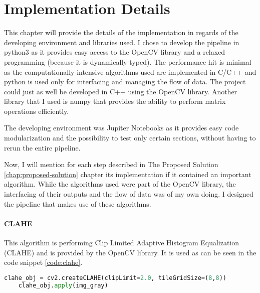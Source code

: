 \chapter{Implementation Details}\pagestyle{fancy}\setlength{\parindent}{3em}
\label{chap:implementation-details}

This chapter will provide the details of the implementation in regards of the developing environment and libraries used. I chose to develop the pipeline in python3 \cite{site:python-about-page} as it provides easy access to the OpenCV \cite{site:OpenCV-about-page} library and a relaxed programming (because it is dynamically typed). The performance hit is minimal as the computationally intensive algorithms used are implemented in C/C++ and python is used only for interfacing and managing the flow of data. The project could just as well be developed in C++ using the OpenCV library. Another library that I used is numpy that provides the ability to perform matrix operations efficiently.

The developing environment was Jupiter Notebooks \cite{site:jupyter_notebooks-about-page} as it provides easy code modularization and the possibility to test only certain sections, without having to rerun the entire pipeline.

Now, I will mention for each step described in The Proposed Solution \ref{chap:proposed-solution} chapter its implementation if it contained an important algorithm. While the algorithms used were part of the OpenCV library, the interfacing of their outputs and the flow of data was of my own doing. I designed the pipeline that makes use of these algorithms.

\subsubsection{CLAHE}

This algorithm is performing Clip Limited Adaptive Histogram Equalization (CLAHE) and is provided by the OpenCV library. It is used as can be seen in the code snippet \ref{code:clahe}.

\begin{lstlisting}[language=Python, label=code:clahe, caption={CLAHE}]
    clahe_obj = cv2.createCLAHE(clipLimit=2.0, tileGridSize=(8,8))
    clahe_obj.apply(img_gray)
\end{lstlisting}

